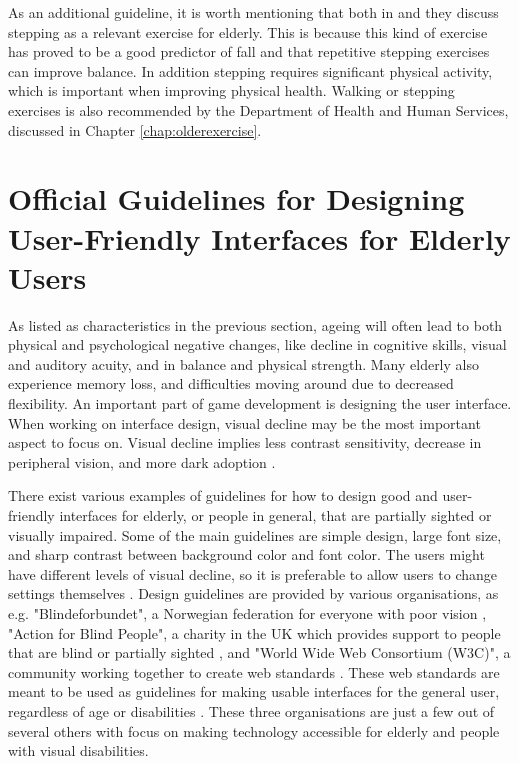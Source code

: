As an additional guideline, it is worth mentioning that both in \cite{bruin} and \cite{gerling2} they discuss stepping as a relevant exercise for elderly. This is because this kind of exercise has proved to be a good predictor of fall and that repetitive stepping exercises can improve balance. In addition stepping requires significant physical activity, which is important when improving physical health. Walking or stepping exercises is also recommended by the Department of Health and Human Services, discussed in Chapter \ref{chap:olderexercise}.


\section{Official Guidelines for Designing User-Friendly Interfaces for Elderly Users}
\label{sec:designelderly}

As listed as characteristics in the previous section, ageing will often lead to both physical and psychological negative changes, like decline in cognitive skills, visual and auditory acuity, and in balance and physical strength. Many elderly also experience memory loss, and difficulties moving around due to decreased flexibility. An important part of game development is designing the user interface. When working on interface design, visual decline may be the most important aspect to focus on. Visual decline implies less contrast sensitivity, decrease in peripheral vision, and more dark adoption \cite{ijsselsteijn2007digital}. 

There exist various examples of guidelines for how to design good and user-friendly interfaces for elderly, or people in general, that are partially sighted or visually impaired. Some of the main guidelines are simple design, large font size, and sharp contrast between background color and font color. The users might have different levels of visual decline, so it is preferable to allow users to change settings themselves \cite{blindeforbundetTekst} \cite{actionforblindpeopleTekst} \cite{w3cTekst}. Design guidelines are provided by various organisations, as e.g. "Blindeforbundet", a Norwegian federation for everyone with poor vision \cite{blindeforbundet}, "Action for Blind People", a charity in the UK which provides support to people that are blind or partially sighted \cite{actionforblindpeople}, and "World Wide Web Consortium (W3C)", a community working together to create web standards \cite{w3c}. These web standards are meant to be used as guidelines for making usable interfaces for the general user, regardless of age or disabilities \cite{w3cTekst}. These three organisations are just a few out of several others with focus on making technology accessible for elderly and people with visual disabilities. 

